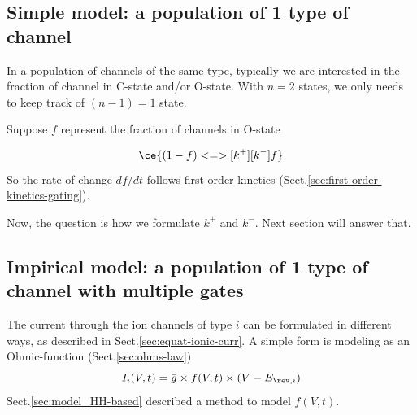 
\subsection{Simple model: a population of 1 type of channel}


In a population of channels of the same type, typically we are interested in the
fraction of channel in C-state and/or O-state. With $n=2$ states, we only needs
to keep track of $(n-1)=1$ state.

Suppose $f$ represent the fraction of channels in O-state

\begin{equation}
\ce{(1-f) <=>[k^+][k^-] f}
\end{equation}
So the rate of change $df/dt$ follows first-order kinetics
(Sect.\ref{sec:first-order-kinetics-gating}).

Now, the question is how we formulate $k^+$ and $k^-$. Next section will answer
that.

\subsection{Impirical model: a population of 1 type of channel with multiple
gates}

The current through the ion channels of type $i$ can be formulated in
different ways, as described in Sect.\ref{sec:equat-ionic-curr}. A simple form
is modeling as an Ohmic-function (Sect.\ref{sec:ohms-law})
\begin{equation}
I_i(V,t) = \bar{g} \times f(V,t) \times (V - E_{\rev,i})
\end{equation}
Sect.\ref{sec:model_HH-based} described a method to model $f(V,t)$.

